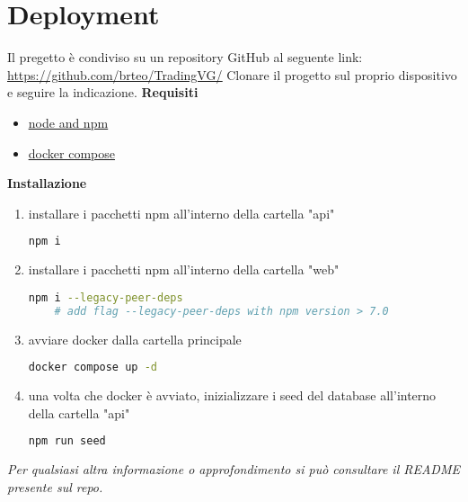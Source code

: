 \section{Deployment}
Il pregetto è condiviso su un repository GitHub al seguente link:
\newline{\\}
\noindent
\underline{\href{https://github.com/brteo/TradingVG/}{https://github.com/brteo/TradingVG/}}
\newline{\\}
\noindent
Clonare il progetto sul proprio dispositivo e seguire la indicazione.
\newline{\\}
\noindent
\textbf{Requisiti}
\begin{itemize}
	\item{\underline{\href{https://docs.npmjs.com/downloading-and-installing-node-js-and-npm}{node and npm}}}
	\item{\underline{\href{https://docs.docker.com/compose/install/}{docker compose}}}
\end{itemize}
\noindent
\textbf{Installazione}
\begin{enumerate}
	\item{installare i pacchetti npm all'interno della cartella "api"}
\begin{lstlisting}[language=bash]
	npm i
\end{lstlisting}		
	\item{installare i pacchetti npm all'interno della cartella "web"}
\begin{lstlisting}[language=bash]
	npm i --legacy-peer-deps
	# add flag --legacy-peer-deps with npm version > 7.0
\end{lstlisting}
	\item{avviare docker dalla cartella principale}
\begin{lstlisting}[language=bash]
	docker compose up -d
\end{lstlisting}
	\item{una volta che docker è avviato, inizializzare i seed del database all'interno della cartella "api"}
\begin{lstlisting}[language=bash]
	npm run seed
\end{lstlisting}
\end{enumerate}

\bigbreak
\noindent
\textit{Per qualsiasi altra informazione o approfondimento si può consultare il README presente sul repo.}